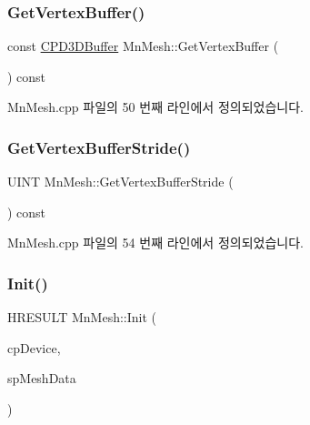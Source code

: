 \mbox{\label{class_m_n_l_1_1_mn_mesh_a3c8f3380c7ea8a5927a61e667400e9a8}} 
\subsubsection{\texorpdfstring{Get\+Vertex\+Buffer()}{GetVertexBuffer()}}
{\footnotesize\ttfamily const \hyperlink{namespace_m_n_l_aab9c90a8c27ac6410a9cc7cd89efeef1}{C\+P\+D3\+D\+Buffer} Mn\+Mesh\+::\+Get\+Vertex\+Buffer (\begin{DoxyParamCaption}{ }\end{DoxyParamCaption}) const}



Mn\+Mesh.\+cpp 파일의 50 번째 라인에서 정의되었습니다.

\mbox{\label{class_m_n_l_1_1_mn_mesh_aa8706a7d5ca39d4666867c24d5a3be5a}} 
\subsubsection{\texorpdfstring{Get\+Vertex\+Buffer\+Stride()}{GetVertexBufferStride()}}
{\footnotesize\ttfamily U\+I\+NT Mn\+Mesh\+::\+Get\+Vertex\+Buffer\+Stride (\begin{DoxyParamCaption}{ }\end{DoxyParamCaption}) const}



Mn\+Mesh.\+cpp 파일의 54 번째 라인에서 정의되었습니다.

\mbox{\label{class_m_n_l_1_1_mn_mesh_a694b6dfe0ae3ed0f97bcf055525b8659}} 
\subsubsection{\texorpdfstring{Init()}{Init()}}
{\footnotesize\ttfamily H\+R\+E\+S\+U\+LT Mn\+Mesh\+::\+Init (\begin{DoxyParamCaption}\item[{const \hyperlink{namespace_m_n_l_a1eec210db8f309a4a9ac0d9658784c31}{C\+P\+D3\+D\+Device} \&}]{cp\+Device,  }\item[{const std\+::shared\+\_\+ptr$<$ \hyperlink{class_m_n_l_1_1_mn_mesh_data}{Mn\+Mesh\+Data} $>$}]{sp\+Mesh\+Data }\end{DoxyParamCaption})\hspace{0.3cm}{\ttfamily [virtual]}}



